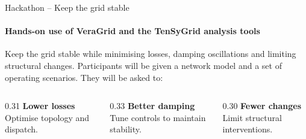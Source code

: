 \documentclass[aspectratio=1609,9pt]{beamer}
\begin{document}
\begin{frame}[t]{Hackathon -- Keep the grid stable}
  \framesubtitle{Hands-on use of VeraGrid and the TenSyGrid analysis tools}
  \vspace{1.5ex}
  Keep the grid stable while minimising losses, damping oscillations and limiting structural changes. Participants will be given a network model and a set of operating scenarios. They will be asked to:
  \par\vspace{2ex}
  \begin{columns}[T,onlytextwidth]
    \begin{column}{0.31\textwidth}
      {\color{tgpetrol}\large\textbf{Lower losses}}\\[0.5ex]
      Optimise topology and dispatch.
    \end{column}
    \begin{column}{0.33\textwidth}
      {\color{tgpetrol}\large\textbf{Better damping}}\\[0.5ex]
      Tune controls to maintain stability.
    \end{column}
    \begin{column}{0.30\textwidth}
      {\color{tgpetrol}\large\textbf{Fewer changes}}\\[0.5ex]
      Limit structural interventions.
    \end{column}
  \end{columns}
  \par\vspace{3ex}
  \centering
\end{frame}
\end{document}
